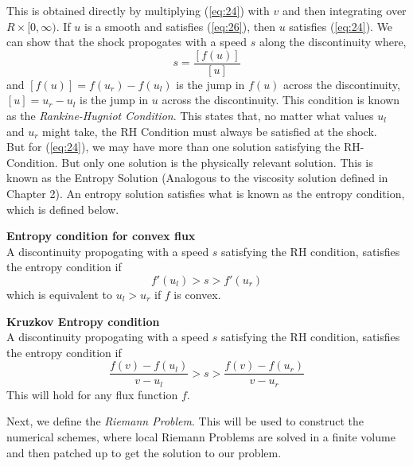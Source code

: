\noindent
This is obtained directly by multiplying (\ref{eq:24}) with $v$ and then integrating over $R \times [0,\infty)$. If $u$ is a smooth and satisfies (\ref{eq:26}), then $u$ satisfies (\ref{eq:24}). We can show that the shock propogates with a speed $s$ along the discontinuity where,
\begin{equation}
	s = \frac{[f(u)]}{[u]}
\end{equation} 
and $[f(u)] = f(u_r) - f(u_l)$ is the jump in $f(u)$ across the discontinuity, $[u] = u_r - u_l$ is the jump in $u$ across the discontinuity. This condition is known as the \emph{Rankine-Hugniot Condition}. This states that, no matter what values $u_l$ and $u_r$ might take, the RH Condition must always be satisfied at the shock.\\

\noindent
But for (\ref{eq:24}), we may have more than one solution satisfying the RH-Condition. But only one solution is the physically relevant solution. This is known as the Entropy Solution (Analogous to the viscosity solution defined in Chapter 2). An entropy solution satisfies what is known as the entropy condition, which is defined below.
\begin{definition}
	\textbf{Entropy condition for convex flux}\\
	
	\noindent
	A discontinuity propogating with a speed $s$ satisfying the RH condition, satisfies the entropy condition if 
	\begin{equation}
		f'(u_l) > s > f'(u_r)
	\end{equation}
	which is equivalent to $u_l > u_r$ if $f$ is convex.
\end{definition}
\begin{definition}
	\textbf{Kruzkov Entropy condition}\\
	
	\noindent
	A discontinuity propogating with a speed $s$ satisfying the RH condition, satisfies the entropy condition if 
	\begin{equation}
	\frac{f(v) - f(u_l)}{v-u_l} > s > \frac{f(v) - f(u_r)}{v - u_r}
	\end{equation}
	This will hold for any flux function $f$.
\end{definition}

\noindent
Next, we define the \emph{Riemann Problem}. This will be used to construct the numerical schemes, where local Riemann Problems are solved in a finite volume and then patched up to get the solution to our problem.\\


